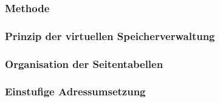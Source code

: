 \subsubsection{Methode}
\subsubsection{Prinzip der virtuellen Speicherverwaltung}
\subsubsection{Organisation der Seitentabellen}

\subsubsection{Einstufige Adressumsetzung}

